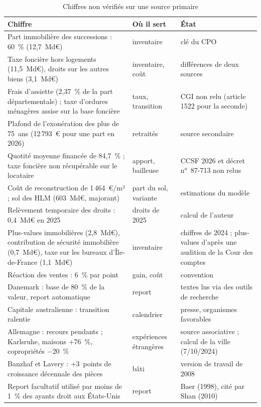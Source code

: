 \begin{table}[!htbp]\centering\scriptsize
\caption{Chiffres non vérifiés sur une source primaire}\label{tab:fon_nv}
\begin{tabularx}{\linewidth}{@{}>{\raggedright\arraybackslash}p{5.4cm}>{\raggedright\arraybackslash}p{2.6cm}>{\raggedright\arraybackslash}X@{}}
\toprule
Chiffre & Où il sert & État \\
\midrule
Part immobilière des successions : 60~\% (12,7~Md€) & inventaire & clé du CPO \\
Taxe foncière hors logements (11,5~Md€), droits sur les autres biens (3,1~Md€) & inventaire, coût & différences de deux sources \\
Frais d'assiette (2,37~\% de la part départementale) ; taxe d'ordures ménagères assise sur la base foncière & taux, transition & CGI non relu (article 1522 pour la seconde) \\
Plafond de l'exonération des plus de 75~ans (12\,793~€ pour une part en 2026) & retraités & source secondaire \\
Quotité moyenne financée de 84,7~\% ; taxe foncière non récupérable sur le locataire & apport, bailleuse & CCSF 2026 et décret n°~87-713 non relus \\
Coût de reconstruction de 1\,464~€/m² ; sol des HLM (603~Md€, majorant) & part du sol, variante & estimations du modèle \\
Relèvement temporaire des droits : 0,4~Md€ en 2025 & droits de 2025 & calcul de l'auteur \\
Plus-values immobilières (2,8~Md€), contribution de sécurité immobilière (0,7~Md€), taxe sur les bureaux d'Île-de-France (1,1~Md€) & inventaire & chiffres de 2024 ; plus-values d'après une audition de la Cour des comptes \\
Réaction des ventes : 6~\% par point & gain, coût & convention \\
Danemark : base de 80~\% de la valeur, report automatique & report & textes lus via des outils de recherche \\
Capitale australienne : transition ralentie & calendrier & presse, organismes favorables \\
Allemagne : recours pendants ; Karlsruhe, maisons +76~\%, copropriétés $-$20~\% & expériences étrangères & source associative ; calcul de la ville (7/10/2024) \\
Banzhaf et Lavery : +3~points de croissance décennale des pièces & bâti & version de travail de 2008 \\
Report facultatif utilisé par moins de 1~\% des ayants droit aux États-Unis & report & Baer (1998), cité par Shan (2010) \\
\bottomrule
\end{tabularx}
\end{table}
